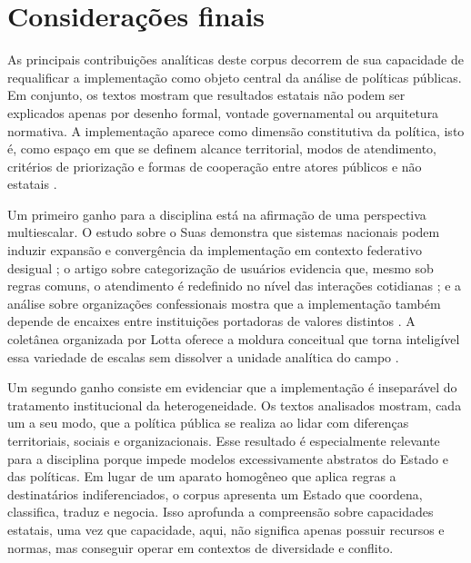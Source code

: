 \documentclass[12pt,a4paper]{article}
\begin{document}
\section{Considerações finais}
\label{sec:orgbf3ccc8}

As principais contribuições analíticas deste corpus decorrem de sua capacidade de requalificar a implementação como objeto central da análise de políticas públicas. Em conjunto, os textos mostram que resultados estatais não podem ser explicados apenas por desenho formal, vontade governamental ou arquitetura normativa. A implementação aparece como dimensão constitutiva da política, isto é, como espaço em que se definem alcance territorial, modos de atendimento, critérios de priorização e formas de cooperação entre atores públicos e não estatais \parencite{lotta2019_teorias_analises,bichir2020_sistemas_nacionais,lotta2020_categorizando_usuarios,lotta2023_jesus_speaks}.

Um primeiro ganho para a disciplina está na afirmação de uma perspectiva multiescalar. O estudo sobre o Suas demonstra que sistemas nacionais podem induzir expansão e convergência da implementação em contexto federativo desigual \parencite{bichir2020_sistemas_nacionais}; o artigo sobre categorização de usuários evidencia que, mesmo sob regras comuns, o atendimento é redefinido no nível das interações cotidianas \parencite{lotta2020_categorizando_usuarios}; e a análise sobre organizações confessionais mostra que a implementação também depende de encaixes entre instituições portadoras de valores distintos \parencite{lotta2023_jesus_speaks}. A coletânea organizada por Lotta oferece a moldura conceitual que torna inteligível essa variedade de escalas sem dissolver a unidade analítica do campo \parencite{lotta2019_teorias_analises}.

Um segundo ganho consiste em evidenciar que a implementação é inseparável do tratamento institucional da heterogeneidade. Os textos analisados mostram, cada um a seu modo, que a política pública se realiza ao lidar com diferenças territoriais, sociais e organizacionais. Esse resultado é especialmente relevante para a disciplina porque impede modelos excessivamente abstratos do Estado e das políticas. Em lugar de um aparato homogêneo que aplica regras a destinatários indiferenciados, o corpus apresenta um Estado que coordena, classifica, traduz e negocia. Isso aprofunda a compreensão sobre capacidades estatais, uma vez que capacidade, aqui, não significa apenas possuir recursos e normas, mas conseguir operar em contextos de diversidade e conflito.
\end{document}
